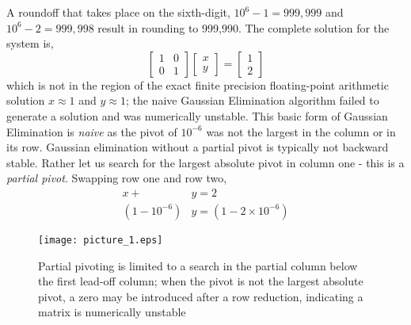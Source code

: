 \documentclass[7pt]{article}
\begin{document}
A roundoff that takes place on the sixth-digit, $10^6 - 1 = 999,999$ and $10^6 - 2 = 999,998$ result in rounding to 999,990.  The complete solution for the system is,
\begin{equation*}
\left[
\begin{array}{cc}%
1 & 0  \\  
0 & 1
\end{array}  
\right]
\left[
\begin{array}{c}%
x \\  
y
\end{array}  
\right]
=
\left[
\begin{array}{c}%
1 \\  
2
\end{array}  
\right]
\end{equation*}
which is not in the region of the exact finite precision floating-point arithmetic solution $x \approx 1$ and $y \approx 1$; the naive Gaussian Elimination algorithm failed to generate a solution and was numerically unstable. This basic form of Gaussian Elimination is \emph{naive} as the pivot of $10^{-6}$ was not the largest in the column or in its row. Gaussian elimination without a partial pivot is typically not backward stable. Rather let us search for the largest absolute pivot in column one - this is a \emph{partial pivot}. Swapping row one and row two, 
\begin{equation*}
\begin{split}
x  + &  y = 2 \\
(1 - 10^{-6})  & y= (1 - 2 \times 10^{-6})
\end{split}
\end{equation*}
\begin{figure}
	\begin{minipage}[c]{0.3\textwidth}
		\caption{
			Partial pivoting is limited to a search in the partial column below the first  lead-off column; when the pivot is not the largest absolute pivot, a zero may be introduced after a row reduction, indicating a matrix is numerically unstable
		} \label{fig:03-03}
	\end{minipage}
	\begin{minipage}[c]{0.67\textwidth}
		\texttt{[image: picture\_1.eps]}
	\end{minipage}\hfill
\end{figure}
\end{document}
